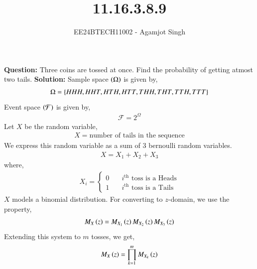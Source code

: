 \documentclass[journal]{IEEEtran}
\begin{document}

\vspace{3cm}

\title{11.16.3.8.9}
\author{EE24BTECH11002 - Agamjot Singh}
{\let\newpage\relax\maketitle}

\renewcommand{\thefigure}{\theenumi}
\renewcommand{\thetable}{\theenumi}
\setlength{\intextsep}{10pt} %

\textbf{Question:}
\newline
Three coins are tossed at once. Find the probability of getting atmost two tails.
\newline
\textbf{Solution:}
\newline
Sample space $\left(\Omega\right)$ is given by,
\begin{align}
    \Omega = \left\{HHH, HHT, HTH, HTT, THH, THT, TTH, TTT\right\}
\end{align}
Event space $\left(\mathcal{F}\right)$ is given by,
\begin{align}
    \mathcal{F} = 2^{\Omega}
\end{align}
Let $X$ be the random variable,
\begin{align}
    X = \text{number of tails in the sequence}
\end{align}
We express this random variable as a sum of $3$ bernoulli random variables.
\begin{align}
    X = X_1 + X_2 + X_3
\end{align}
where,
\begin{align}
    X_{i} = \begin{cases}
        0 & \quad i^{\text{th}} \text{ toss is a Heads}\\
        1 & \quad i^{\text{th}} \text{ toss is a Tails}
    \end{cases}
\end{align}
$X$ models a binomial distribution.
\newline
For converting to $z$-domain, we use the property,
\begin{align}
    M_{X}\left(z\right) = M_{X_1}\left(z\right) M_{X_2}\left(z\right) M_{X_3}\left(z\right)
\end{align}
Extending this system to $m$ tosses, we get, 
\begin{align}
    M_{X}\left(z\right) = \prod_{k = 1}^{m} M_{X_{k}}\left(z\right)
\end{align}
\end{document}
